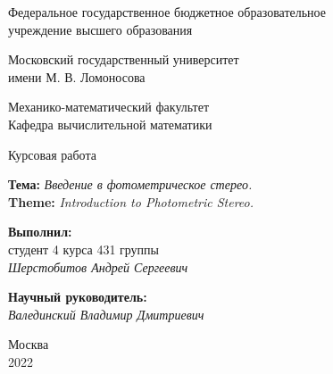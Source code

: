 \begin{titlepage}
  \begin{center}
    \large{Федеральное государственное бюджетное образовательное\\
      учреждение высшего образования\\}

    Московский государственный университет\\
    имени М. В. Ломоносова\\

    \vspace{0.25 cm}

    \normalsize{Механико-математический факультет\\}
    \vspace{0.5 cm}
    Кафедра вычислительной математики\\
  \end{center}

  \vspace{3cm}

  \begin{center}
    \LARGE{Курсовая работа}\\

    \vspace{0.5 cm}

    \normalsize{}
    \textbf{Тема:} \textit{Введение в фотометрическое стерео.} \\
    \textbf{Theme:} \textit{Introduction to Photometric Stereo.}
  \end{center}

  \vspace{3 cm}

  \begin{flushright}
    \textbf{Выполнил:}\\
    студент 4 курса
    431 группы\\

    \textit{Шерстобитов Андрей Сергеевич}\\

    \vspace{1 cm}

    \textbf{Научный руководитель:}\\

    \textit{Валединский Владимир Дмитриевич}
  \end{flushright}

  \vspace{\fill}
  \normalsize{}
  \begin{center}
    Москва\\2022
  \end{center}

  \thispagestyle{empty}
\end{titlepage}
